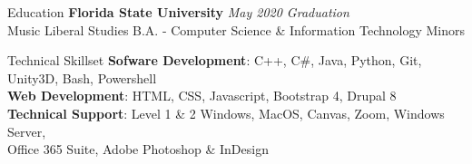 \documentclass{resume} %
\begin{document}
	
	\begin{rSection}{Education}
		{\bf Florida State University} \hfill {\em May 2020 Graduation} \\
		Music Liberal Studies B.A. - Computer Science \& Information Technology Minors
	\end{rSection}
	
	
	
	\begin{rSection}{Technical Skillset}
		\textbf{Sofware Development}: C++, C\#, Java, Python, Git, Unity3D, Bash, Powershell \\
		\textbf{Web Development}: HTML, CSS, Javascript, Bootstrap 4, Drupal 8 \\
		\textbf{Technical Support}: Level 1 \& 2 Windows, MacOS, Canvas,  Zoom, Windows Server,\\ \phantom \quad \hspace{3.3cm} Office 365 Suite, Adobe Photoshop \& InDesign
	\end{rSection}
	
	
	
\end{document}
